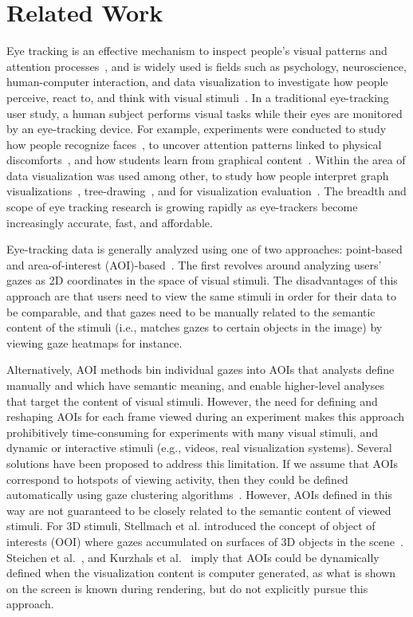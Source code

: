 \section{Related Work}
Eye tracking is an effective mechanism to inspect people's visual patterns and attention processes~\cite{jacob1991use}, and is widely used is fields such as psychology, neuroscience, human-computer interaction, and data visualization to investigate how people perceive, react to, and think with visual stimuli~\cite{duchowski2002breadth}. In a traditional eye-tracking user study, a human subject performs visual tasks while their eyes are monitored by an eye-tracking device. For example, experiments were conducted to study how people recognize faces~\cite{guo2014perceiving},  to uncover attention patterns linked to physical discomforts~\cite{vervoort2013attentional}, and how students learn from graphical content~\cite{mayer2010unique}. Within the area of data visualization was used among other, to study how people interpret graph visualizations~\cite{pohl2009comparing, huang2008beyond, huang2005people}, tree-drawing~\cite{burch2011evaluation, burch2013visual}, and for visualization evaluation~\cite{kim2012does}. The breadth and scope of eye tracking research is growing rapidly as eye-trackers become increasingly accurate, fast, and affordable.  

Eye-tracking data is generally analyzed using one of two approaches: point-based and area-of-interest (AOI)-based~\cite{blascheck2014state}. The first revolves around analyzing users' gazes as 2D coordinates in the space of visual stimuli. The disadvantages of this approach are that users need to view the same stimuli in order for their data to be comparable, and that gazes need to be manually related to the semantic content of the stimuli (i.e., matches gazes to certain objects in the image) by viewing gaze heatmaps for instance.  

Alternatively, AOI methods bin individual gazes into AOIs that analysts define manually and which have semantic meaning, and enable higher-level analyses that target the content of visual stimuli. However, the need for defining and reshaping AOIs for each frame viewed during an experiment makes this approach prohibitively time-consuming for experiments with many visual stimuli, and dynamic or interactive stimuli (e.g., videos, real visualization systems).  Several solutions have been proposed to address this limitation. If we assume that AOIs correspond to hotspots of viewing activity, then they could be defined automatically using gaze clustering algorithms~\cite{privitera2000algorithms, santella2004robust, drusch2014analysing}.  However, AOIs defined in this way are not guaranteed to be closely related to the semantic content of viewed stimuli.  For 3D stimuli, Stellmach et al. introduced the concept of object of interests (OOI) where gazes accumulated on surfaces of 3D objects in the scene~\cite{stellmach20103d}. Steichen et al.~\cite{steichen2013user}, and Kurzhals et al.~\cite{kurzhals2014iseecube} imply that AOIs could be dynamically defined when the visualization content is computer generated, as what is shown on the screen is known during rendering, but do not explicitly pursue this approach. 

